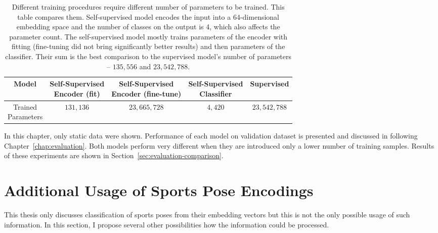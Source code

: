 \begin{table}[!ht]
    \begin{center}
        \begin{tabular}{ |c||c|c|c|c| }
            \hline
                Model & \makecell{Self-Supervised \\ Encoder (fit)} & \makecell{Self-Supervised \\ Encoder (fine-tune)} & \makecell{Self-Supervised \\ Classifier} & Supervised \\
            \hline
            \hline
                \makecell{Trained \\ Parameters} & $131{,}136$ & $23{,}665{,}728$ & $4{,}420$ & $23{,}542{,}788$ \\
            \hline
        \end{tabular}
    \end{center}
    \caption{Different training procedures require different number of parameters to be trained. This table compares them. Self-supervised model encodes the input into a 64-dimensional embedding space and the number of classes on the output is 4, which also affects the parameter count. The self-supervised model mostly trains parameters of the encoder with fitting (fine-tuning did not bring significantly better results) and then parameters of the classifier. Their sum is the best comparison to the supervised model's number of parameters -- $135{,}556$ and $23{,}542{,}788$.}
    \label{tab:selfsupervised-vs-supervised-params}
\end{table}

In this chapter, only static data were shown. Performance of each model on validation dataset is presented and discussed in following Chapter~\ref{chap:evaluation}. Both models perform very different when they are introduced only a lower number of training samples. Results of these experiments are shown in Section~\ref{sec:evaluation-comparison}.

\section{\label{sec:additional-usage}Additional Usage of Sports Pose Encodings}

This thesis only discusses classification of sports poses from their embedding vectors but this is not the only possible usage of such information. In this section, I propose several other possibilities how the information could be processed.

